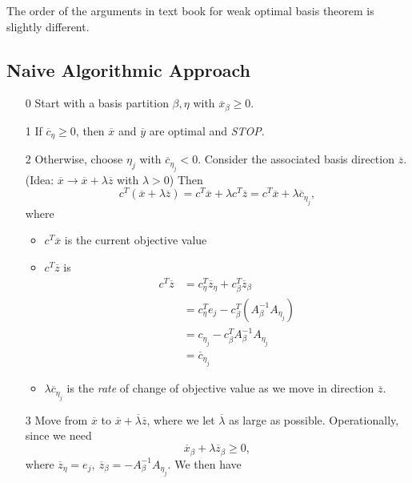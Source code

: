 \begin{note}
	The order of the arguments in text book for weak optimal basis theorem is slightly different.
\end{note}

\subsection{Naive Algorithmic Approach}
\begin{enumerate}
	\item[0] Start with a basis partition \(\beta, \eta\) with \(\overline{x}_{\beta}\geq 0\).
	\item[1] If \(\overline{c}_{\eta}\geq 0\), then \(\overline{x}\) and \(\overline{y}\) are optimal and \emph{STOP}.
	\item[2] Otherwise, choose \(\eta_j	\) with \(\overline{c}_{\eta_j}<0\). Consider the associated basis direction \(\overline{z}\).(Idea: \(\overline{x}\to \overline{x}+\lambda \overline{z}\) with \(\lambda >0\)) Then
		\[
			c^{T}(\overline{x} + \lambda \overline{z}) = c^{T} \overline{x} + \lambda c^{T} \overline{z} = c^{T} \overline{x} + \lambda \overline{c}_{\eta_j},
		\]
		where \begin{itemize}
			\item \(c^{T} \overline{x}\) is the current objective value
			\item \(c^{T}\overline{z}\) is
			      \[
				      \begin{split}
					      c^{T}\overline{z} &= c_{\eta}^{T} \overline{z}_{\eta}+c_{\beta}^{T} \overline{z}_{\beta}\\
					      &=c_{\eta}^{T}e_{j} - c_{\beta}^{T}(A^{-1}_{\beta}A_{\eta_j})\\
					      &=c_{\eta_{j}} - c_{\beta}^{T} A^{-1}_{\beta}A_{\eta_j}\\
					      &= \overline{c}_{\eta_{j}}
				      \end{split}
			      \]
			\item \(\lambda \overline{c}_{\eta_{j}}\) is the \emph{rate} of change of objective value as we move in direction \(\overline{z}\).
		\end{itemize}
	\item[3] Move from \(\overline{x}\) to \(\overline{x}+\overline{\lambda} \overline{z}\), where we let \(\overline{\lambda}\) as large as possible. Operationally, since we need
		\[
			\overline{x}_{\beta} + \lambda \overline{z}_{\beta} \geq 0,
		\]
		where \(\overline{z}_{\eta} = e_{j},\ \overline{z}_{\beta} = -A^{-1}_{\beta}A_{\eta_{j}}\). We then have

\end{enumerate}
